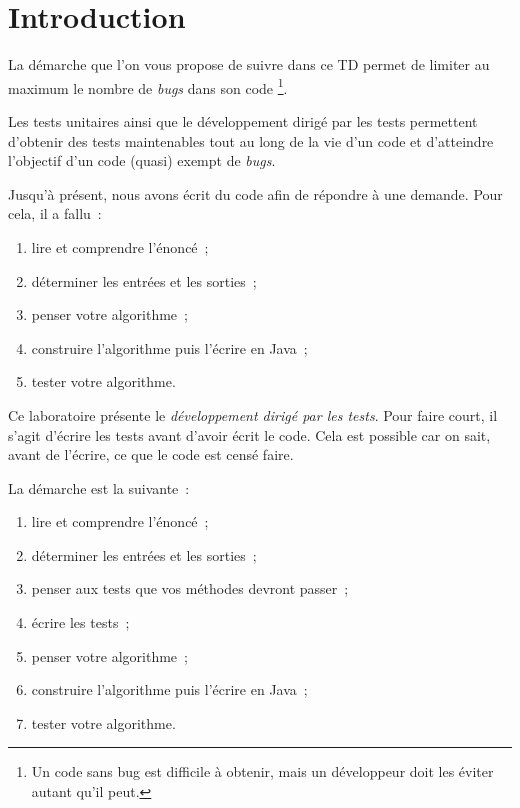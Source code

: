 \documentclass[a4paper,11pt]{style-esi/td}
\begin{document}

\section{Introduction}

La démarche que l'on vous propose de suivre dans ce TD permet de limiter au maximum
le nombre de \textit{bugs} dans son code%
\footnote{%
	Un code sans bug est difficile à obtenir,
	mais un développeur doit les éviter autant qu'il peut.
}.

Les tests unitaires ainsi que le développement dirigé par les tests permettent
d'obtenir des tests maintenables tout au long de la vie d'un code et
d'atteindre l'objectif d'un code (quasi) exempt de \textit{bugs}.

Jusqu'à présent, nous avons écrit du code afin de répondre à une demande.
Pour cela, il a fallu~:
\begin{enumerate}
	\item lire et comprendre l'énoncé~;
	\item déterminer les entrées et les sorties~;
	\item penser votre algorithme~;
	\item construire l'algorithme puis l'écrire en Java~;
	\item tester votre algorithme.
\end{enumerate}

Ce laboratoire présente le \emph{développement dirigé par les tests}.
Pour faire court, il s'agit d'écrire les tests avant d'avoir écrit le code.
Cela est possible car on sait, avant de l'écrire, ce que le code est censé faire.

La démarche est la suivante~:
\begin{enumerate}
	\item lire et comprendre l'énoncé~;
	\item déterminer les entrées et les sorties~;
	\item penser aux tests que vos méthodes devront passer~;
	\item écrire les tests~;
	\item penser votre algorithme~;
	\item construire l'algorithme puis l'écrire en Java~;
	\item tester votre algorithme.
\end{enumerate}
\end{document}
